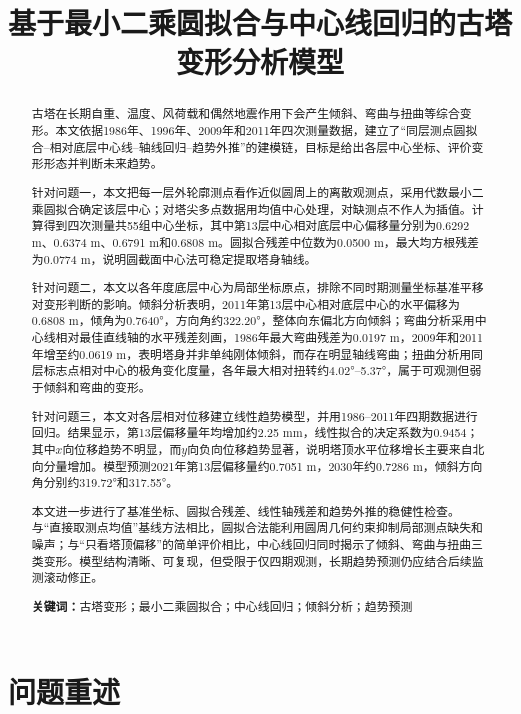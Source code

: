 \documentclass[UTF8,a4paper,12pt]{ctexart}
\title{\heiti 基于最小二乘圆拟合与中心线回归的古塔变形分析模型}
\author{}
\date{}
\begin{document}
\maketitle
\thispagestyle{empty}

\begin{abstract}
古塔在长期自重、温度、风荷载和偶然地震作用下会产生倾斜、弯曲与扭曲等综合变形。本文依据1986年、1996年、2009年和2011年四次测量数据，建立了“同层测点圆拟合--相对底层中心线--轴线回归--趋势外推”的建模链，目标是给出各层中心坐标、评价变形形态并判断未来趋势。

针对问题一，本文把每一层外轮廓测点看作近似圆周上的离散观测点，采用代数最小二乘圆拟合确定该层中心；对塔尖多点数据用均值中心处理，对缺测点不作人为插值。计算得到四次测量共55组中心坐标，其中第13层中心相对底层中心偏移量分别为0.6292 m、0.6374 m、0.6791 m和0.6808 m。圆拟合残差中位数为0.0500 m，最大均方根残差为0.0774 m，说明圆截面中心法可稳定提取塔身轴线。

针对问题二，本文以各年度底层中心为局部坐标原点，排除不同时期测量坐标基准平移对变形判断的影响。倾斜分析表明，2011年第13层中心相对底层中心的水平偏移为0.6808 m，倾角为0.7640°，方向角约322.20°，整体向东偏北方向倾斜；弯曲分析采用中心线相对最佳直线轴的水平残差刻画，1986年最大弯曲残差为0.0197 m，2009年和2011年增至约0.0619 m，表明塔身并非单纯刚体倾斜，而存在明显轴线弯曲；扭曲分析用同层标志点相对中心的极角变化度量，各年最大相对扭转约4.02°--5.37°，属于可观测但弱于倾斜和弯曲的变形。

针对问题三，本文对各层相对位移建立线性趋势模型，并用1986--2011年四期数据进行回归。结果显示，第13层偏移量年均增加约2.25 mm，线性拟合的决定系数为0.9454；其中$x$向位移趋势不明显，而$y$向负向位移趋势显著，说明塔顶水平位移增长主要来自北向分量增加。模型预测2021年第13层偏移量约0.7051 m，2030年约0.7286 m，倾斜方向角分别约319.72°和317.55°。

本文进一步进行了基准坐标、圆拟合残差、线性轴残差和趋势外推的稳健性检查。与“直接取测点均值”基线方法相比，圆拟合法能利用圆周几何约束抑制局部测点缺失和噪声；与“只看塔顶偏移”的简单评价相比，中心线回归同时揭示了倾斜、弯曲与扭曲三类变形。模型结构清晰、可复现，但受限于仅四期观测，长期趋势预测仍应结合后续监测滚动修正。

\textbf{关键词：}古塔变形；最小二乘圆拟合；中心线回归；倾斜分析；趋势预测
\end{abstract}

\newpage
\tableofcontents
\newpage

\section{问题重述}
\end{document}
